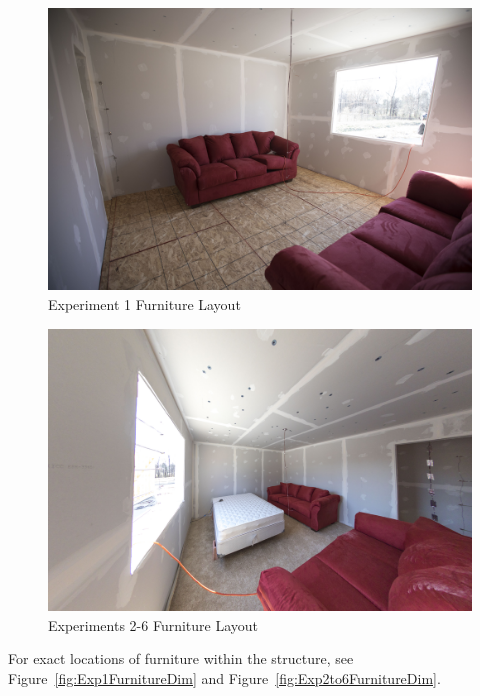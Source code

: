 \documentclass[12pt,oneside]{book}
\begin{document}
\begin{figure}[H]
	\centering
	\includegraphics[width=\textwidth]{Figures/Furniture/Exp1Furniture.jpg}
	\caption{Experiment 1 Furniture Layout}
	\label{fig:Exp1Furniture}
\end{figure}

\begin{figure}[H]
	\centering
	\includegraphics[width=\textwidth]{Figures/Furniture/Exp2to6Furniture.jpg}
	\caption{Experiments 2-6 Furniture Layout}
	\label{fig:Exp2to6Furniture}
\end{figure}

For exact locations of furniture within the structure, see Figure~\ref{fig:Exp1FurnitureDim} and Figure~\ref{fig:Exp2to6FurnitureDim}. 
\end{document}
